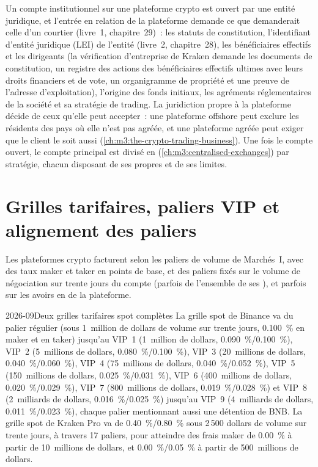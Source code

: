 Un compte institutionnel sur une plateforme crypto est ouvert par une entité juridique, et l'entrée en relation de la plateforme demande ce que demanderait celle d'un courtier
(livre~1, chapitre~29)~: les statuts de constitution, l'identifiant d'entité juridique (LEI) de l'entité (livre~2, chapitre~28), les bénéficiaires
effectifs et les dirigeants (la vérification d'entreprise de Kraken demande les documents de constitution, un registre des actions des bénéficiaires effectifs ultimes avec leurs
droits financiers et de vote, un organigramme de propriété et une preuve de l'adresse d'exploitation), l'origine des fonds initiaux, les agréments réglementaires de la société et sa stratégie de trading. La juridiction propre à la plateforme
décide de ceux qu'elle peut accepter~: une plateforme offshore peut exclure les résidents des pays où elle n'est pas agréée, et une
plateforme agréée peut exiger que le client le soit aussi (\cref{ch:m3:the-crypto-trading-business}). Une fois le compte ouvert, le compte principal
est divisé en  (\cref{ch:m3:centralised-exchanges}) par stratégie, chacun disposant de ses propres  et de ses limites.

\section{Grilles tarifaires, paliers VIP et alignement des paliers}

Les plateformes crypto facturent selon les paliers de volume de Marchés~I, avec des taux maker et taker en points de base, et des paliers fixés sur le
volume de négociation sur trente jours du compte (parfois de l'ensemble de ses ), et parfois sur les avoirs en
 de la plateforme.

\begin{dated}{2026-09}{Deux grilles tarifaires spot complètes}\label{dat:m3:getting-access-crypto-venues:tiers}
La grille spot de Binance va du palier régulier (sous 1~million de dollars de volume sur trente jours, 0.100~\% en maker et en taker) jusqu'au VIP~1
(1~million de dollars, 0.090~\%/0.100~\%), VIP~2 (5~millions de dollars, 0.080~\%/0.100~\%), VIP~3 (20~millions de dollars, 0.040~\%/0.060~\%), VIP~4 (75~millions de dollars,
0.040~\%/0.052~\%), VIP~5 (150~millions de dollars, 0.025~\%/0.031~\%), VIP~6 (400~millions de dollars, 0.020~\%/0.029~\%), VIP~7 (800~millions de dollars, 0.019~\%/0.028~\%) et
VIP~8 (2~milliards de dollars, 0.016~\%/0.025~\%) jusqu'au VIP~9 (4~milliards de dollars, 0.011~\%/0.023~\%), chaque palier mentionnant aussi une détention de BNB. La grille spot de Kraken Pro
va de 0.40~\%/0.80~\% sous 2\,500 dollars de volume sur trente jours, à travers 17 paliers, pour atteindre des frais maker de 0.00~\% à partir de 10~millions de dollars, et
0.00~\%/0.05~\% à partir de 500~millions de dollars.
\end{dated}

